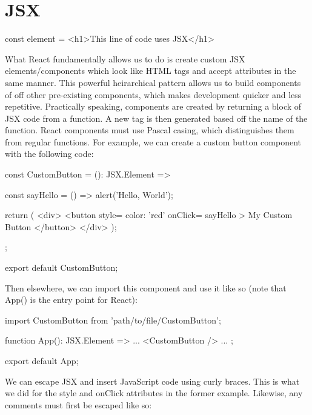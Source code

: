 \documentclass{article}
\begin{document}
\section{JSX}

\begin{tslst}

const element = <h1>This line of code uses JSX</h1>

\end{tslst}

What React fundamentally allows us to do is create custom JSX elements/components which look like HTML tags
and accept attributes in the same manner. This powerful heirarchical pattern allows us to build components of
off other pre-existing components, which makes development quicker and less repetitive. Practically speaking,
components are created by returning a block of JSX code from a function. A new tag is then generated based off
the name of the function. React components must use Pascal casing, which distinguishes them from regular
functions. For example, we can create a custom button component with the following code:

\begin{tslst}

const CustomButton = (): JSX.Element => {
    const sayHello = () => {
        alert('Hello, World');
    }

    return (
        <div>
            <button
                style={ color: 'red' }
                onClick={ sayHello }>
                My Custom Button
            </button>
        </div>
    );
};

export default CustomButton;

\end{tslst}

Then elsewhere, we can import this component and use it like so (note that App() is the entry point for
React):

\begin{tslst}

import CustomButton from 'path/to/file/CustomButton';

function App(): JSX.Element => {
    ...
    <CustomButton />
    ...
};

export default App;

\end{tslst}

We can escape JSX and insert JavaScript code using curly braces. This is what we did for the style and
onClick attributes in the former example. Likewise, any comments must first be escaped like so:
\end{document}
